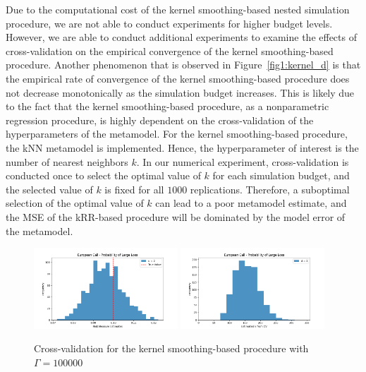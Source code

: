 Due to the computational cost of the kernel smoothing-based nested simulation procedure, we are not able to conduct experiments for higher budget levels.
However, we are able to conduct additional experiments to examine the effects of cross-validation on the empirical convergence of the kernel smoothing-based procedure.
Another phenomenon that is observed in Figure~\ref{fig1:kernel_d} is that the empirical rate of convergence of the kernel smoothing-based procedure does not decrease monotonically as the simulation budget increases.
This is likely due to the fact that the kernel smoothing-based procedure, as a nonparametric regression procedure, is highly dependent on the cross-validation of the hyperparameters of the metamodel.
For the kernel smoothing-based procedure, the kNN metamodel is implemented. 
Hence, the hyperparameter of interest is the number of nearest neighbors $k$.
In our numerical experiment, cross-validation is conducted once to select the optimal value of $k$ for each simulation budget, and the selected value of $k$ is fixed for all $\num{1000}$ replications.
Therefore, a suboptimal selection of the optimal value of $k$ can lead to a poor metamodel estimate, and the MSE of the kRR-based procedure will be dominated by the model error of the metamodel.

\begin{figure}[ht!]
    \centering
    \includegraphics[width=0.48\textwidth]{./project1/figures/figure5a.png}
    \includegraphics[width=0.48\textwidth]{./project1/figures/figure5b.png}
    \caption{Cross-validation for the kernel smoothing-based procedure with $\Gamma=\num{100000}$}
    \label{fig1:kernel_cv} 
\end{figure}

